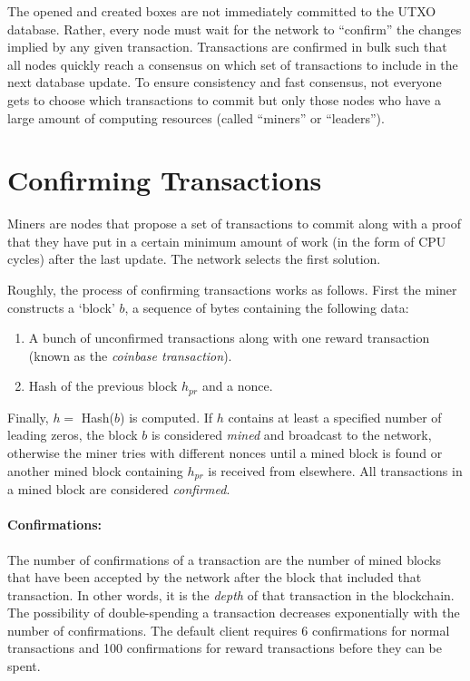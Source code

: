 \documentclass[]{report}   %
\begin{document}
The opened and created boxes are not immediately committed to the UTXO database. Rather, every node must wait for the network to ``confirm'' the changes implied by any given transaction.  
Transactions are confirmed in bulk such that all nodes quickly reach a consensus on which set of transactions to include in the next database update. 
To ensure consistency and fast consensus, not everyone gets to choose which transactions to commit but only those nodes who have a large amount of computing resources (called ``miners'' or ``leaders'').

 
\section{Confirming Transactions}
\label{sec:verify}
Miners are nodes that propose a set of transactions to commit along with a proof that they have put in a certain minimum amount of work (in the form of CPU cycles) after the last update. The network selects the first solution. 

Roughly, the process of confirming transactions works as follows. First the miner constructs a `block' $b$, a sequence of bytes containing the following data:
\begin{enumerate}
	\item A bunch of unconfirmed transactions along with one reward transaction %
	(known as the \emph{coinbase transaction}).
	\item Hash of the previous block $h_{pr}$  and a nonce. %
\end{enumerate}

 Finally, $h =$ Hash($b$) is computed. If $h$ contains at least a specified number of leading zeros, the block $b$ is considered {\em mined} and broadcast to the network, otherwise the miner tries with different nonces until a mined block is found or another mined block containing $h_{pr}$ is received from elsewhere. All transactions in a mined block are considered {\em confirmed}.

\paragraph{Confirmations:} The number of confirmations of a transaction are the number of mined blocks that have been accepted by the network after the block that included that transaction. In other words, it is the {\em depth} of that transaction in the blockchain. The possibility of double-spending a transaction decreases exponentially with the number of confirmations. The default client requires 6 confirmations for normal transactions and 100 confirmations for reward transactions before they can be spent.  
\end{document}
